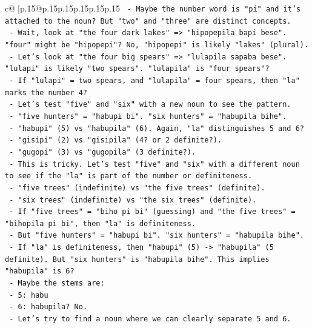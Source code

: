 \documentclass{article}
\begin{document}
{\begin{supertabular}{c@{$\;$}|p{.15\linewidth}@{}p{.15\linewidth}p{.15\linewidth}p{.15\linewidth}p{.15\linewidth}p{.15\linewidth}}
{{{\texttt{       {-} Maybe the number word is "pi" and it's attached to the noun? But "two" and "three" are distinct concepts.} \\
\texttt{       {-} Wait, look at "the four dark lakes" => "hipopepila bapi bese". "four" might be "hipopepi"? No, "hipopepi" is likely "lakes" (plural).} \\
\texttt{       {-} Let's look at "the four big spears" => "lulapila sapaba bese". "lulapi" is likely "two spears". "lulapila" is "four spears"?} \\
\texttt{       {-} If "lulapi" = two spears, and "lulapila" = four spears, then "la" marks the number 4?} \\
\texttt{       {-} Let's test "five" and "six" with a new noun to see the pattern.} \\
\texttt{       {-} "five hunters" = "habupi bi". "six hunters" = "habupila bihe".} \\
\texttt{       {-} "habupi" (5) vs "habupila" (6). Again, "la" distinguishes 5 and 6?} \\
\texttt{       {-} "gisipi" (2) vs "gisipila" (4? or 2 definite?).} \\
\texttt{       {-} "gugopi" (3) vs "gugopila" (3 definite?).} \\
\texttt{       {-} This is tricky. Let's test "five" and "six" with a different noun to see if the "la" is part of the number or definiteness.} \\
\texttt{       {-} "five trees" (indefinite) vs "the five trees" (definite).} \\
\texttt{       {-} "six trees" (indefinite) vs "the six trees" (definite).} \\
\texttt{       {-} If "five trees" = "biho pi bi" (guessing) and "the five trees" = "bihopila pi bi", then "la" is definiteness.} \\
\texttt{       {-} But "five hunters" = "habupi bi". "six hunters" = "habupila bihe".} \\
\texttt{       {-} If "la" is definiteness, then "habupi" (5) {-}> "habupila" (5 definite). But "six hunters" is "habupila bihe". This implies "habupila" is 6?} \\
\texttt{       {-} Maybe the stems are:} \\
\texttt{         {-} 5: habu} \\
\texttt{         {-} 6: habupila? No.} \\
\texttt{       {-} Let's try to find a noun where we can clearly separate 5 and 6.} \\
}}}
\end{supertabular}}
\end{document}

